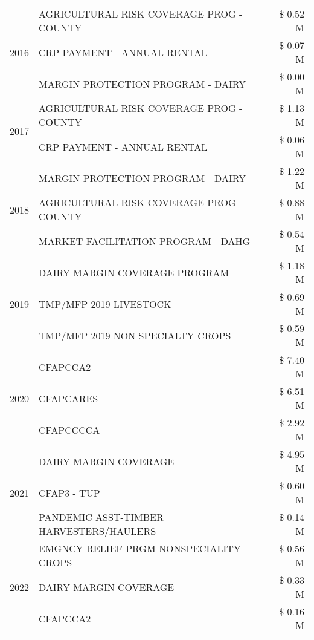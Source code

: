 \begin{tabular}{llr}
\cline{1-3}
\multirow[t]{3}{*}{2016} & AGRICULTURAL RISK COVERAGE PROG - COUNTY & \$ 0.52 M \\
 & CRP PAYMENT - ANNUAL RENTAL & \$ 0.07 M \\
 & MARGIN PROTECTION PROGRAM - DAIRY & \$ 0.00 M \\
\cline{1-3}
\multirow[t]{2}{*}{2017} & AGRICULTURAL RISK COVERAGE PROG - COUNTY & \$ 1.13 M \\
 & CRP PAYMENT - ANNUAL RENTAL & \$ 0.06 M \\
\cline{1-3}
\multirow[t]{3}{*}{2018} & MARGIN PROTECTION PROGRAM - DAIRY & \$ 1.22 M \\
 & AGRICULTURAL RISK COVERAGE PROG - COUNTY & \$ 0.88 M \\
 & MARKET FACILITATION PROGRAM - DAHG & \$ 0.54 M \\
\cline{1-3}
\multirow[t]{3}{*}{2019} & DAIRY MARGIN COVERAGE PROGRAM & \$ 1.18 M \\
 & TMP/MFP 2019 LIVESTOCK & \$ 0.69 M \\
 & TMP/MFP 2019 NON SPECIALTY CROPS & \$ 0.59 M \\
\cline{1-3}
\multirow[t]{3}{*}{2020} & CFAPCCA2 & \$ 7.40 M \\
 & CFAPCARES & \$ 6.51 M \\
 & CFAPCCCCA & \$ 2.92 M \\
\cline{1-3}
\multirow[t]{3}{*}{2021} & DAIRY MARGIN COVERAGE & \$ 4.95 M \\
 & CFAP3 - TUP & \$ 0.60 M \\
 & PANDEMIC ASST-TIMBER HARVESTERS/HAULERS & \$ 0.14 M \\
\cline{1-3}
\multirow[t]{3}{*}{2022} & EMGNCY RELIEF PRGM-NONSPECIALITY CROPS & \$ 0.56 M \\
 & DAIRY MARGIN COVERAGE & \$ 0.33 M \\
 & CFAPCCA2 & \$ 0.16 M \\
\cline{1-3}
\bottomrule
\end{tabular}
